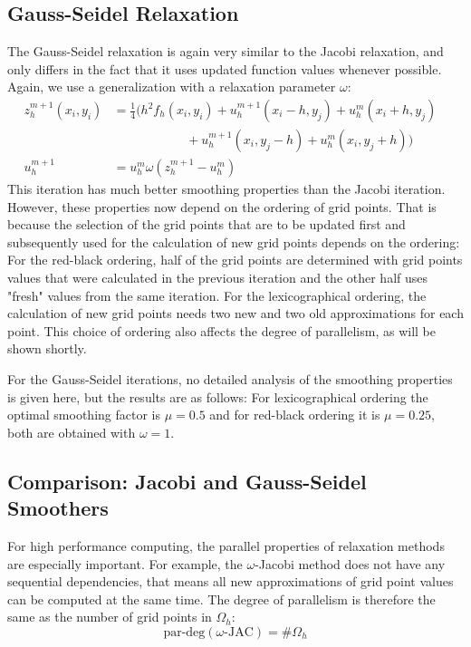 \subsection{Gauss-Seidel Relaxation}
The Gauss-Seidel relaxation is again very similar to the Jacobi relaxation, and only differs in the fact that it uses updated function values whenever possible. Again, we use a generalization with a relaxation parameter $\omega$:
\begin{align}
z_h^{m+1}(x_i, y_i)&= \frac{1}{4} \Big ( h^2 f_h(x_i, y_i) + u_h^{m+1}(x_i-h, y_j) + u_h^m(x_i+h, y_j) \nonumber \\
                  &~~~~~~~~~~~~~~~~~~~~~~~~~~+ u_h^{m+1}(x_i, y_j-h) + u_h^m(x_i,y_j+h) \Big ) \\
        u_h^{m+1} &= u_h^m \omega (z_h^{m+1} - u_h^m) & \nonumber
\end{align}
This iteration has much better smoothing properties than the Jacobi iteration. However, these properties now depend on the ordering of grid points. That is because the selection of the grid points that are to be updated first and subsequently used for the calculation of new grid points depends on the ordering: For the red-black ordering, half of the grid points are determined with grid points values that were calculated in the previous iteration and the other half uses "fresh" values from the same iteration. For the lexicographical ordering, the calculation of new grid points needs two new and two old approximations for each point. This choice of ordering also affects the degree of parallelism, as will be shown shortly. 

For the Gauss-Seidel iterations, no detailed analysis of the smoothing properties is given here, but the results are as follows: For lexicographical ordering the optimal smoothing factor is $\mu = 0.5$  and  for red-black ordering it is $\mu = 0.25$, both are obtained with $\omega = 1$. 


\subsection{Comparison: Jacobi and Gauss-Seidel Smoothers}

For high performance computing, the parallel properties of relaxation methods are especially important. For example, the $\omega$-Jacobi method does not have any sequential dependencies, that means all new approximations of grid point values can be computed at the same time. The degree of parallelism is therefore the same as the number of grid points in $\Omega_h$:
\begin{equation}
\text{par-deg}(\omega\textrm{-JAC}) = \#\Omega_h
\end{equation}

